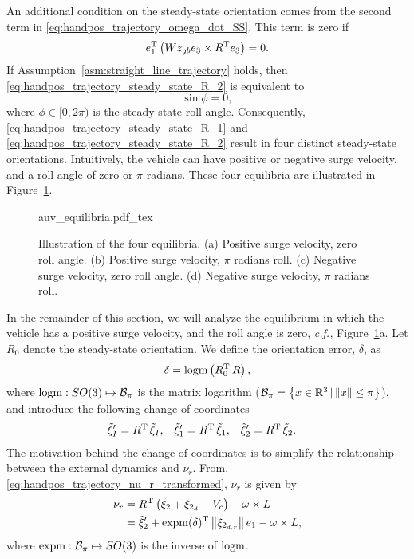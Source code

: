 An additional condition on the steady-state orientation comes from the second term in \eqref{eq:handpos_trajectory_omega_dot_SS}.
This term is zero if
\begin{equation}
    e_1^{\mathrm{T}} \left(Wz_{gb} e_3 \times R^{\mathrm{T}} e_3\right) = 0. \label{eq:handpos_trajectory_steady_state_R_2}
\end{equation}
If Assumption~\ref{asm:straight_line_trajectory} holds, then \eqref{eq:handpos_trajectory_steady_state_R_2} is equivalent to
\begin{equation}
    \sin\phi = 0,
\end{equation}
where $\phi \in [0, 2\pi)$ is the steady-state roll angle.
Consequently, \eqref{eq:handpos_trajectory_steady_state_R_1} and \eqref{eq:handpos_trajectory_steady_state_R_2} result in four distinct steady-state orientations.
Intuitively, the vehicle can have positive or negative surge velocity, and a roll angle of zero or $\pi$ radians.
These four equilibria are illustrated in Figure~\ref{fig:equilibria}.

\begin{figure}[tb]
    \centering
    \def\svgwidth{0.48\textwidth}
    {auv_equilibria.pdf_tex}
    \caption{Illustration of the four equilibria. (a) Positive surge velocity, zero roll angle. (b) Positive surge velocity, $\pi$ radians roll. (c) Negative surge velocity, zero roll angle. (d) Negative surge velocity, $\pi$ radians roll.}
    \label{fig:equilibria}
\end{figure}

In the remainder of this section, we will analyze the equilibrium in which the vehicle has a positive surge velocity, and the roll angle is zero, \emph{c.f.,} Figure~\ref{fig:equilibria}a.
Let $R_0$ denote the steady-state orientation.
We define the orientation error, $\delta$, as
\begin{equation}
    \delta = {\rm logm}\left(R_0^{\mathrm{T}}\,R\right),
    \label{eq:handpos_trajectory_delta}
\end{equation}
where ${\rm logm}: SO(3) \mapsto \mathcal{B}_{\pi}$ is the matrix logarithm \cite{iserles_lie_2000} ($\mathcal{B}_{\pi} = \left\{x \in \mathbb{R}^3\, | \left\|x\right\| \leq \pi\right\}$), and introduce the following change of coordinates
\begin{align}
    \tilde{\xi}_I^{\prime} &= R^{\mathrm{T}}\,\tilde{\xi}_I, &
    \tilde{\xi}_1^{\prime} &= R^{\mathrm{T}}\,\tilde{\xi}_1, &
    \tilde{\xi}_2^{\prime} &= R^{\mathrm{T}}\,\tilde{\xi}_2.
\end{align}
The motivation behind the change of coordinates is to simplify the relationship between the external dynamics and $\nu_r$.
From, \eqref{eq:handpos_trajectory_nu_r_transformed}, $\nu_r$ is given by
\begin{equation}
    \begin{split}
    \nu_r &= R^{\mathrm{T}}\left(\tilde{\xi}_2 + \xi_{2_d} - V_c\right) - \omega \times L \\
        &= \tilde{\xi}_2^{\prime} + {\rm expm}(\delta)^{\mathrm{T}} \left\|\xi_{2_{d,r}}\right\|e_1 - \omega \times L,
    \end{split}
\end{equation}
where ${\rm expm}: \mathcal{B}_{\pi} \mapsto SO(3)$ is the inverse of ${\rm logm}$.

